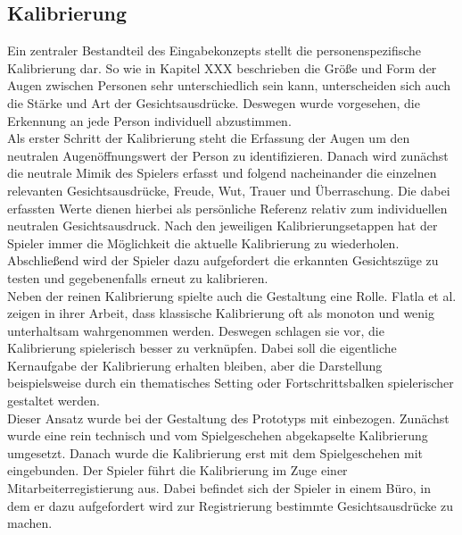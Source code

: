 \documentclass[intern]{cgMA}
\begin{document}
\subsection{Kalibrierung}
Ein zentraler Bestandteil des Eingabekonzepts stellt die personenspezifische Kalibrierung dar. So wie in Kapitel XXX beschrieben die Größe und Form der Augen zwischen Personen sehr unterschiedlich sein kann, unterscheiden sich auch die Stärke und Art der Gesichtsausdrücke. Deswegen wurde vorgesehen, die Erkennung an jede Person individuell abzustimmen.\\
Als erster Schritt der Kalibrierung steht die Erfassung der Augen um den neutralen Augenöffnungswert der Person zu identifizieren. Danach wird zunächst die neutrale Mimik des Spielers erfasst und folgend nacheinander die einzelnen relevanten Gesichtsausdrücke, Freude, Wut, Trauer und Überraschung. Die dabei erfassten Werte dienen hierbei als persönliche Referenz relativ zum individuellen neutralen Gesichtsausdruck. Nach den jeweiligen Kalibrierungsetappen hat der Spieler immer die Möglichkeit die aktuelle Kalibrierung zu wiederholen. Abschließend wird der Spieler dazu aufgefordert die erkannten Gesichtszüge zu testen und gegebenenfalls erneut zu kalibrieren. \\
Neben der reinen Kalibrierung spielte auch die Gestaltung eine Rolle. Flatla et al. \cite{flatla2011calibration} zeigen in ihrer Arbeit, dass klassische Kalibrierung oft als monoton und wenig unterhaltsam wahrgenommen werden. Deswegen schlagen sie vor, die Kalibrierung spielerisch besser zu verknüpfen. Dabei soll die eigentliche Kernaufgabe der Kalibrierung erhalten bleiben, aber die Darstellung beispielsweise durch ein thematisches Setting oder Fortschrittsbalken spielerischer gestaltet werden.\cite{flatla2011calibration}\\
Dieser Ansatz wurde bei der Gestaltung des Prototyps mit einbezogen. Zunächst wurde eine rein technisch und vom Spielgeschehen abgekapselte Kalibrierung umgesetzt. Danach wurde die Kalibrierung erst mit dem Spielgeschehen mit eingebunden. Der Spieler führt die Kalibrierung im Zuge einer Mitarbeiterregistierung aus. Dabei befindet sich der Spieler in einem Büro, in dem er dazu aufgefordert wird zur Registrierung bestimmte Gesichtsausdrücke zu machen.
\end{document}
